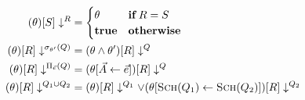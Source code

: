   \begin{align*}
    \mqpushCond{\cond}{R}{S} &=
                               \begin{cases}
                                 \cond &\mathbf{if}\, R = S\\
                                 \T &\mathbf{otherwise}
                               \end{cases}\\
    \mqpushCond{\cond}{\selection_{\cond'}(\query)}{\rel} &= \mqpushCond{\cond \land \cond'}{\query}{\rel}\\
    \mqpushCond{\cond}{\projection_{\vec{e}}(\query)}{\rel} &= \mqpushCond{\cond[\vec{A} \gets \vec{e}]}{\query}{\rel}\\
    \mqpushCond{\cond}{\query_1 \union \query_2}{\rel} &= \mqpushCond{\cond}{\query_1}{\rel} \lor \mqpushCond{\cond[\schema{\query_1} \gets \schema{\query_2}]}{\query_2}{\rel}\\
  \end{align*}



